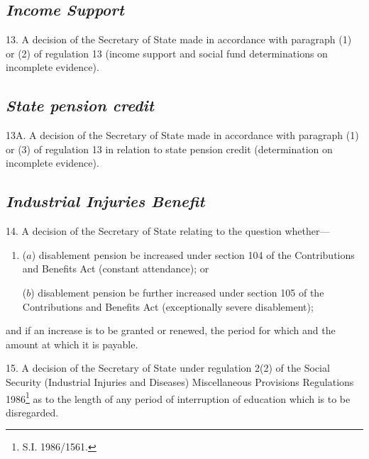 \documentclass[12pt,a4paper]{article}
\begin{document}
\subsection*{\itshape Income Support}

13.  A decision of the Secretary of State 
made in accordance with paragraph (1) or (2) of regulation 13 (income support and social fund determinations on incomplete evidence).


\subsection*{\itshape State pension credit}

13A.  A decision of the Secretary of State made in accordance with paragraph (1) or (3) of regulation 13 in relation to state pension credit (determination on incomplete evidence).


\subsection*{\itshape Industrial Injuries Benefit}

14.  A decision of the Secretary of State relating to the question whether—
\begin{enumerate}\item[]
($a$) disablement pension be increased under section 104 of the Contributions and Benefits Act (constant attendance); or

($b$) disablement pension be further increased under section 105 of the Contributions and Benefits Act (exceptionally severe disablement);
\end{enumerate}
and if an increase is to be granted or renewed, the period for which and the amount at which it is payable.

\medskip

15.  A decision of the Secretary of State under regulation 2(2) of the Social Security (Industrial Injuries and Diseases) Miscellaneous Provisions Regulations 1986\footnote{\frenchspacing S.I. 1986/1561.} as to the length of any period of interruption of education which is to be disregarded.
\end{document}
